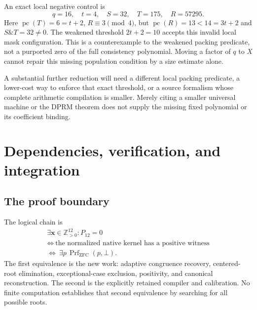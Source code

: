 \documentclass[11pt]{article}
\newcommand{\Zp}{\mathbb Z_{>0}}
\newcommand{\pc}{\operatorname{pc}}
\theoremstyle{remark}
\begin{document}
An exact local negative control is
\[
 q=16,\quad t=4,\quad S=32,\quad T=175,\quad R=57295.
\]
Here $\pc(T)=6=t+2$, $R\equiv3\pmod4$, but $\pc(R)=13<14=3t+2$
and $S\mathbin{\&}T=32\ne0$. The weakened threshold $2t+2=10$ accepts
this invalid local mask configuration. This is a counterexample to the
weakened packing predicate, not a purported zero of the full consistency
polynomial. Moving a factor of $q$ to $X$ cannot repair this missing
population condition by a size estimate alone.

A substantial further reduction will need a different local packing
predicate, a lower-cost way to enforce that exact threshold, or a source
formalism whose complete arithmetic compilation is smaller. Merely citing
a smaller universal machine or the DPRM theorem does not supply the missing
fixed polynomial or its coefficient binding.

\section{Dependencies, verification, and integration}
\label{sec:dependencies}

\subsection{The proof boundary}

The logical chain is
\[
 \begin{gathered}
 \exists\mathbf x\in\Zp^{12}:P_{12}=0\\
 \Longleftrightarrow\ \text{the normalized native kernel has a positive witness}\\
 \Longleftrightarrow\ \exists p\,\operatorname{Prf}_{\mathrm{ZFC}}(p,\bot).
 \end{gathered}
\]
The first equivalence is the new work: adaptive congruence recovery,
centered-root elimination, exceptional-case exclusion, positivity, and
canonical reconstruction. The second is the explicitly retained compiler
and calibration. No finite computation establishes that second equivalence
by searching for all possible roots.
\end{document}
